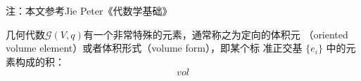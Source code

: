 
注：本文参考Jie Peter《代数学基础》

几何代数$\mathcal G(V,q)$有一个非常特殊的元素，通常称之为定向的体积元
（oriented volume element）或者体积形式（volume form），即某个标
准正交基 $\{e_i\}$ 中的元素构成的积：
$$vol$$